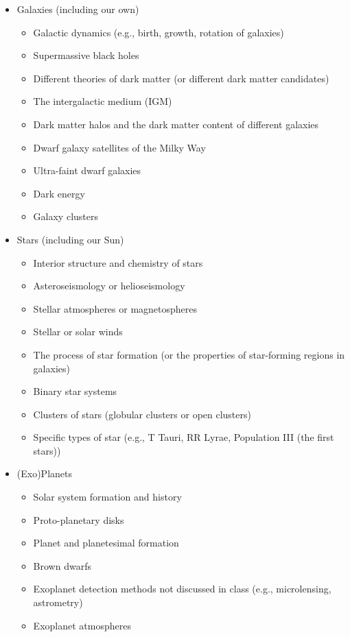 \documentclass[11pt]{article}
\begin{document}
\begin{itemize}[noitemsep]
    \item Galaxies (including our own)
        \begin{itemize}[noitemsep]
            \item Galactic dynamics (e.g., birth, growth, rotation of galaxies)
            \item Supermassive black holes
            \item Different theories of dark matter (or different dark matter candidates)
            \item The intergalactic medium (IGM)
            \item Dark matter halos and the dark matter content of different galaxies
            \item Dwarf galaxy satellites of the Milky Way
            \item Ultra-faint dwarf galaxies
            \item Dark energy
            \item Galaxy clusters
        \end{itemize}

    \item Stars (including our Sun)
        \begin{itemize}[noitemsep]
            \item Interior structure and chemistry of stars
            \item Asteroseismology or helioseismology 
            \item Stellar atmospheres or magnetospheres
            \item Stellar or solar winds
            \item The process of star formation (or the properties of star-forming regions in galaxies)
            \item Binary star systems
            \item Clusters of stars (globular clusters or open clusters)
            \item Specific types of star (e.g., T Tauri, RR Lyrae, Population III (the first stars))
        \end{itemize}

    \item (Exo)Planets
        \begin{itemize}[noitemsep]
            \item Solar system formation and history
            \item Proto-planetary disks
            \item Planet and planetesimal formation
            \item Brown dwarfs
            \item Exoplanet detection methods not discussed in class (e.g., microlensing, astrometry)
            \item Exoplanet atmospheres
        \end{itemize}
    

\end{itemize}
\end{document}
